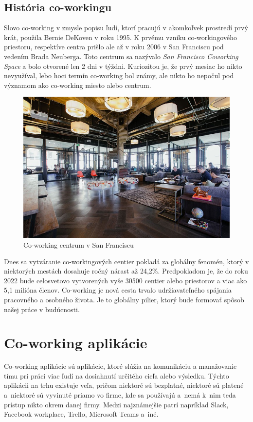 \subsection{História co-workingu}
\indent Slovo co-working v zmysle popisu ľudí, ktorí pracujú v akomkoľvek prostredí prvý krát, použila Bernie DeKoven v roku 1995. K prvému vzniku co-workingového priestoru, respektíve centra prišlo ale až v roku 2006 v San Franciscu pod vedením Brada Neuberga. Toto centrum sa nazývalo \textit{San Francisco Coworking Space} a bolo otvorené len 2 dni v týždni. Kuriozitou je, že prvý mesiac ho nikto nevyužíval, lebo hoci termín co-working bol známy, ale nikto ho nepočul pod významom ako co-working miesto alebo centrum\cite{co_working_spaces}. 

\begin{figure}[H]
    \centering
    \includegraphics[scale=0.50]{img/coworking_space.jpg}
    \caption{Co-working centrum v San Franciscu\cite{co_working_spaces}}
    \label{fig:img-co-space}
\end{figure}

\indent Dnes sa vytváranie co-workingových centier pokladá za globálny fenomén, ktorý v niektorých mestách dosahuje ročný nárast až 24,2\%. Predpokladom je, že do roku 2022 bude celosvetovo vytvorených vyše 30500 centier alebo priestorov a viac ako 5,1 milióna členov. Co-working je nová cesta trvalo udržiavateľného spájania pracovného a osobného života. Je to globálny pilier, ktorý bude formovať spôsob našej práce v budúcnosti\cite{co_working_spaces}. 

\section{Co-working aplikácie}
\indent Co-working aplikácie sú aplikácie, ktoré slúžia na komunikáciu a manažovanie tímu pri práci viac ľudí na dosiahnutí určitého cieľa alebo výsledku. Týchto aplikácii na trhu existuje veľa, pričom niektoré sú bezplatné, niektoré sú platené a niektoré sú vyvinuté priamo vo firme, kde sa používajú a nemá k nim teda prístup nikto okrem danej firmy. Medzi najznámejšie patrí napríklad Slack, Facebook workplace, Trello, Microsoft Teams a iné.
 
